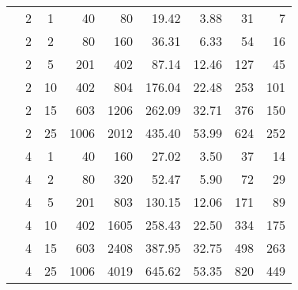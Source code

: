 \documentclass[12pt,a4paper]{article}
\begin{document}
\begin{table}
\begin{center}
\begin{tabular}{cccrrrrrr}
&  2 & 1 &  40 &  80  & 19.42 & 3.88 &  31 &   7 \\ 
&  2 & 2 &  80 & 160  & 36.31 & 6.33 &  54 &  16 \\ 
&  2 & 5 & 201 & 402  & 87.14 & 12.46 & 127 &  45 \\
& 2 & 10 & 402 & 804  & 176.04 & 22.48 & 253 & 101 \\ 
&  2 & 15 & 603 & 1206  & 262.09 & 32.71 & 376 & 150 \\ 
&  2 & 25 & 1006 & 2012  & 435.40 & 53.99 & 624 & 252 \\ \rowcolor[gray]{0.85}
\cellcolor{white}&  4 & 1 &  40 & 160  & 27.02 & 3.50 &  37 &  14 \\  \rowcolor[gray]{0.85}
\cellcolor{white}&  4 & 2 &  80 & 320  & 52.47 & 5.90 &  72 &  29 \\ \rowcolor[gray]{0.85}
\cellcolor{white}&  4 & 5 & 201 & 803  & 130.15 & 12.06 & 171 &  89 \\\rowcolor[gray]{0.85}
\cellcolor{white}&  4 & 10 & 402 & 1605  & 258.43 & 22.50 & 334 & 175 \\ \rowcolor[gray]{0.85}
\cellcolor{white}&  4 & 15 & 603 & 2408  & 387.95 & 32.75 & 498 & 263 \\ \rowcolor[gray]{0.85}
\cellcolor{white}\multirow{-12}{*}{\begin{sideways}\textbf{\large equal width}\end{sideways}} 
&  4 & 25 & 1006 & 4019  & 645.62 & 53.35 & 820 & 449 \\ \hline 
 
\end{tabular}

\end{center}
\end{table}

\clearpage


\end{document}
